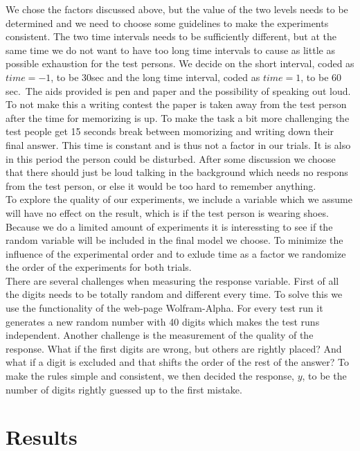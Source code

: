 \documentclass[]{article}
\begin{document}
We chose the factors discussed above, but the value of the two levels
needs to be determined and we need to choose some guidelines to make the
experiments consistent. The two time intervals needs to be sufficiently
different, but at the same time we do not want to have too long time
intervals to cause as little as possible exhaustion for the test
persons. We decide on the short interval, coded as \(time = -1\), to be
\(30\)sec and the long time interval, coded as \(time = 1\), to be
\(60\)sec.~The aids provided is pen and paper and the possibility of
speaking out loud. To not make this a writing contest the paper is taken
away from the test person after the time for memorizing is up. To make
the task a bit more challenging the test people get 15 seconds break
between momorizing and writing down their final answer. This time is
constant and is thus not a factor in our trials. It is also in this
period the person could be disturbed. After some discussion we choose
that there should just be loud talking in the background which needs no
respons from the test person, or else it would be too hard to remember
anything.\\
To explore the quality of our experiments, we include a variable which
we assume will have no effect on the result, which is if the test person
is wearing shoes. Because we do a limited amount of experiments it is
interessting to see if the random variable will be included in the final
model we choose. To minimize the influence of the experimental order and
to exlude time as a factor we randomize the order of the experiments for
both trials.\\
There are several challenges when measuring the response variable. First
of all the digits needs to be totally random and different every time.
To solve this we use the functionality of the web-page Wolfram-Alpha.
For every test run it generates a new random number with 40 digits which
makes the test runs independent. Another challenge is the measurement of
the quality of the response. What if the first digits are wrong, but
others are rightly placed? And what if a digit is excluded and that
shifts the order of the rest of the answer? To make the rules simple and
consistent, we then decided the response, \(y\), to be the number of
digits rightly guessed up to the first mistake.

\section{Results}\label{results}
\end{document}
